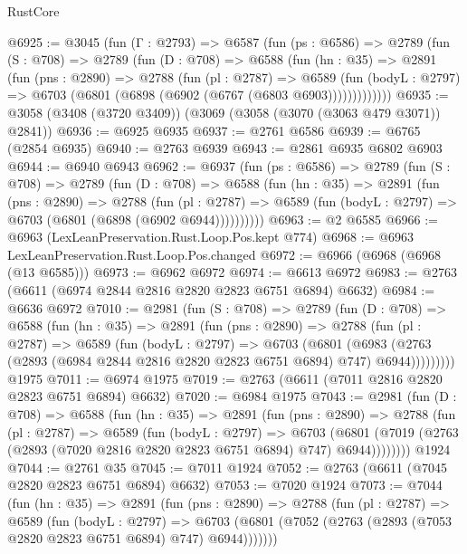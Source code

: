 \begin{lexlean}{RustCore}
\begin{coremodule}
@6925 := @3045
    (fun (Γ : @2793) =>
    @6587
      (fun (ps : @6586) =>
      @2789
        (fun (S : @708) =>
        @2789
          (fun (D : @708) =>
          @6588
            (fun (hn : @35) =>
            @2891
              (fun (pns : @2890) =>
              @2788
                (fun (pl : @2787) =>
                @6589
                  (fun (bodyL : @2797) =>
                  @6703 (@6801 (@6898 (@6902 (@6767 (@6803 @6903)))))))))))))
@6935 := @3058 (@3408 (@3720 @3409)) (@3069 (@3058 (@3070 (@3063 @479 @3071)) @2841))
@6936 := @6925 @6935
@6937 := @2761 @6586
@6939 := @6765 (@2854 @6935)
@6940 := @2763 @6939
@6943 := @2861 @6935 @6802 @6903
@6944 := @6940 @6943
@6962 := @6937
    (fun (ps : @6586) =>
    @2789
      (fun (S : @708) =>
      @2789
        (fun (D : @708) =>
        @6588
          (fun (hn : @35) =>
          @2891
            (fun (pns : @2890) =>
            @2788
              (fun (pl : @2787) =>
              @6589 (fun (bodyL : @2797) => @6703 (@6801 (@6898 (@6902 @6944))))))))))
@6963 := @2 @6585
@6966 := @6963 (LexLeanPreservation.Rust.Loop.Pos.kept @774)
@6968 := @6963 LexLeanPreservation.Rust.Loop.Pos.changed
@6972 := @6966 (@6968 (@6968 (@13 @6585)))
@6973 := @6962 @6972
@6974 := @6613 @6972
@6983 := @2763 (@6611 (@6974 @2844 @2816 @2820 @2823 @6751 @6894) @6632)
@6984 := @6636 @6972
@7010 := @2981
    (fun (S : @708) =>
    @2789
      (fun (D : @708) =>
      @6588
        (fun (hn : @35) =>
        @2891
          (fun (pns : @2890) =>
          @2788
            (fun (pl : @2787) =>
            @6589
              (fun (bodyL : @2797) =>
              @6703
                (@6801
                  (@6983
                    (@2763 (@2893 (@6984 @2844 @2816 @2820 @2823 @6751 @6894) @747) @6944)))))))))
    @1975
@7011 := @6974 @1975
@7019 := @2763 (@6611 (@7011 @2816 @2820 @2823 @6751 @6894) @6632)
@7020 := @6984 @1975
@7043 := @2981
    (fun (D : @708) =>
    @6588
      (fun (hn : @35) =>
      @2891
        (fun (pns : @2890) =>
        @2788
          (fun (pl : @2787) =>
          @6589
            (fun (bodyL : @2797) =>
            @6703
              (@6801 (@7019 (@2763 (@2893 (@7020 @2816 @2820 @2823 @6751 @6894) @747) @6944))))))))
    @1924
@7044 := @2761 @35
@7045 := @7011 @1924
@7052 := @2763 (@6611 (@7045 @2820 @2823 @6751 @6894) @6632)
@7053 := @7020 @1924
@7073 := @7044
    (fun (hn : @35) =>
    @2891
      (fun (pns : @2890) =>
      @2788
        (fun (pl : @2787) =>
        @6589
          (fun (bodyL : @2797) =>
          @6703 (@6801 (@7052 (@2763 (@2893 (@7053 @2820 @2823 @6751 @6894) @747) @6944)))))))

\end{coremodule}
\end{lexlean}

